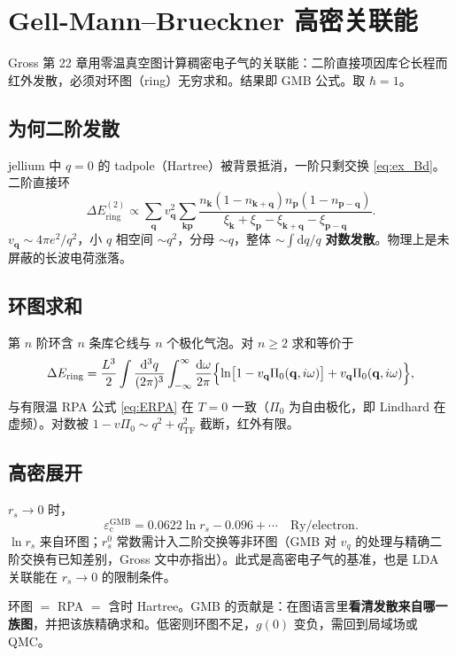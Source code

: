 \section{Gell-Mann--Brueckner 高密关联能}

Gross 第 22 章用零温真空图计算稠密电子气的关联能：二阶直接项因库仑长程而红外发散，必须对环图（ring）无穷求和。结果即 GMB 公式。取 $\hbar=1$。

\subsection{为何二阶发散}

jellium 中 $q=0$ 的 tadpole（Hartree）被背景抵消，一阶只剩交换 \eqref{eq:ex_Bd}。二阶直接环
\begin{equation}
  \Delta E^{(2)}_{\mathrm{ring}}
  \propto
  \sum_{\mathbf{q}}
  v_{\mathbf{q}}^2
  \sum_{\mathbf{k}\mathbf{p}}
  \frac{
  n_{\mathbf{k}}(1-n_{\mathbf{k}+\mathbf{q}})
  n_{\mathbf{p}}(1-n_{\mathbf{p}-\mathbf{q}})
  }{\xi_{\mathbf{k}}+\xi_{\mathbf{p}}-\xi_{\mathbf{k}+\mathbf{q}}-\xi_{\mathbf{p}-\mathbf{q}}}.
\end{equation}
$v_{\mathbf{q}}\sim 4\pi e^2/q^2$，小 $q$ 相空间 $\sim q^2$，分母 $\sim q$，整体 $\sim\int\mathrm{d}q/q$ \textbf{对数发散}。物理上是未屏蔽的长波电荷涨落。

\subsection{环图求和}

第 $n$ 阶环含 $n$ 条库仑线与 $n$ 个极化气泡。对 $n\ge2$ 求和等价于
\begin{equation}
  \Delta E_{\mathrm{ring}}
  =\frac{L^3}{2}
  \int\frac{\mathrm{d}^3q}{(2\pi)^3}
  \int_{-\infty}^{\infty}\frac{\mathrm{d}\omega}{2\pi}
  \Bigl\{
  \ln\bigl[1-v_{\mathbf{q}}\Pi_0(\mathbf{q},i\omega)\bigr]
  +v_{\mathbf{q}}\Pi_0(\mathbf{q},i\omega)
  \Bigr\},
\label{eq:GMB_ring}
\end{equation}
与有限温 RPA 公式 \eqref{eq:ERPA} 在 $T=0$ 一致（$\Pi_0$ 为自由极化，即 Lindhard 在虚频）。对数被 $1-v\Pi_0\sim q^2+q_{\mathrm{TF}}^2$ 截断，红外有限。

\subsection{高密展开}

$r_s\to0$ 时，
\begin{equation}
  \varepsilon_{\mathrm{c}}^{\mathrm{GMB}}
  =0.0622\ln r_s-0.096+\cdots
  \quad\text{Ry/electron}.
\label{eq:GMB}
\end{equation}
$\ln r_s$ 来自环图；$r_s^0$ 常数需计入二阶交换等非环图（GMB 对 $v_q$ 的处理与精确二阶交换有已知差别，Gross 文中亦指出）。此式是高密电子气的基准，也是 LDA 关联能在 $r_s\to0$ 的限制条件。

\begin{note}
环图 $=$ RPA $=$ 含时 Hartree。GMB 的贡献是：在图语言里\textbf{看清发散来自哪一族图}，并把该族精确求和。低密则环图不足，$g(0)$ 变负，需回到局域场或 QMC。
\end{note}
